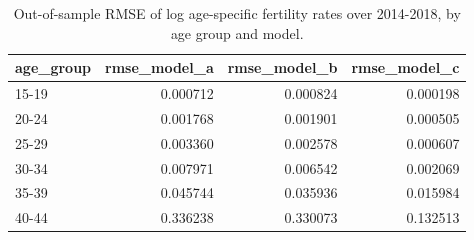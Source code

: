 \begin{table}[ht]
\centering
\begin{tabular}{lrrr}
\hline
age_group & rmse_model_a & rmse_model_b & rmse_model_c \\
\hline
15-19 & 0.000712 & 0.000824 & 0.000198 \\
20-24 & 0.001768 & 0.001901 & 0.000505 \\
25-29 & 0.003360 & 0.002578 & 0.000607 \\
30-34 & 0.007971 & 0.006542 & 0.002069 \\
35-39 & 0.045744 & 0.035936 & 0.015984 \\
40-44 & 0.336238 & 0.330073 & 0.132513 \\
\hline
\end{tabular}
\caption{Out-of-sample RMSE of log age-specific fertility rates over 2014-2018, by age group and model.}
\label{tab:revised_table_e7}
\end{table}
